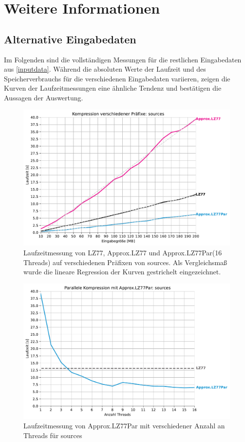 \chapter{Weitere Informationen}
\section{Alternative Eingabedaten} \label{alternative}
Im Folgenden sind die vollständigen Messungen für die restlichen Eingabedaten aus \ref{inputdata}. Während die absoluten Werte
der Laufzeit und des Speicherverbrauchs für die verschiedenen Eingabedaten variieren, zeigen die Kurven der Laufzeitmessungen eine ähnliche Tendenz und bestätigen die
Aussagen der Auswertung.
\begin{figure} [H]
    \centering
    \caption{Laufzeitmessung von LZ77, Approx.LZ77 und Approx.LZ77Par(16 Threads) auf verschiedenen Präfixen von sources. Als Vergleichsmaß wurde 
    die lineare Regression der Kurven gestrichelt eingezeichnet.}
    \includegraphics[scale=0.71]{Images/progressive_sources.pdf}
\end{figure}

\begin{figure}[H]
    \centering
    \caption{Laufzeitmessung von Approx.LZ77Par mit verschiedener Anzahl an Threads für sources}
    \includegraphics[scale=0.68]{Images/progressive_speedup_sources.pdf}
\end{figure}

